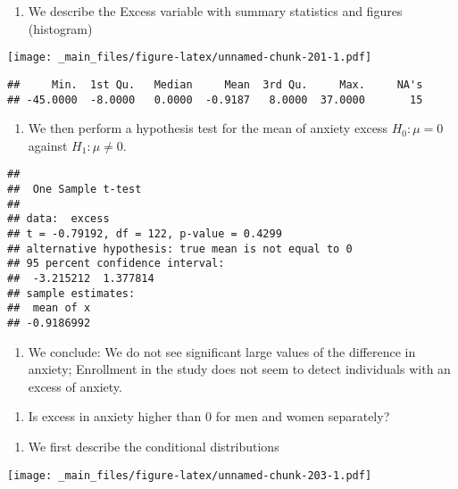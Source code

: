 \documentclass[
]{book}
\providecommand{\tightlist}{%
  \setlength{\itemsep}{0pt}\setlength{\parskip}{0pt}}
\begin{document}
\begin{enumerate}
\def\labelenumi{\alph{enumi}.}
\tightlist
\item
  We describe the Excess variable with summary statistics and figures (histogram)
\end{enumerate}

\texttt{[image: \_main\_files/figure-latex/unnamed-chunk-201-1.pdf]}

\begin{verbatim}
##     Min.  1st Qu.   Median     Mean  3rd Qu.     Max.     NA's 
## -45.0000  -8.0000   0.0000  -0.9187   8.0000  37.0000       15
\end{verbatim}

\begin{enumerate}
\def\labelenumi{\alph{enumi}.}
\setcounter{enumi}{1}
\tightlist
\item
  We then perform a hypothesis test for the mean of anxiety excess \(H_0:\mu=0\) against \(H_1:\mu \neq 0\).
\end{enumerate}

\begin{verbatim}
## 
##  One Sample t-test
## 
## data:  excess
## t = -0.79192, df = 122, p-value = 0.4299
## alternative hypothesis: true mean is not equal to 0
## 95 percent confidence interval:
##  -3.215212  1.377814
## sample estimates:
##  mean of x 
## -0.9186992
\end{verbatim}

\begin{enumerate}
\def\labelenumi{\alph{enumi}.}
\setcounter{enumi}{2}
\tightlist
\item
  We conclude: We do not see significant large values of the difference in anxiety; Enrollment in the study does not seem to detect individuals with an excess of anxiety.
\end{enumerate}

\begin{enumerate}
\def\labelenumi{\arabic{enumi}.}
\setcounter{enumi}{1}
\tightlist
\item
  Is excess in anxiety higher than \(0\) for men and women separately?
\end{enumerate}

\begin{enumerate}
\def\labelenumi{\alph{enumi}.}
\tightlist
\item
  We first describe the conditional distributions
\end{enumerate}

\texttt{[image: \_main\_files/figure-latex/unnamed-chunk-203-1.pdf]}
\end{document}

